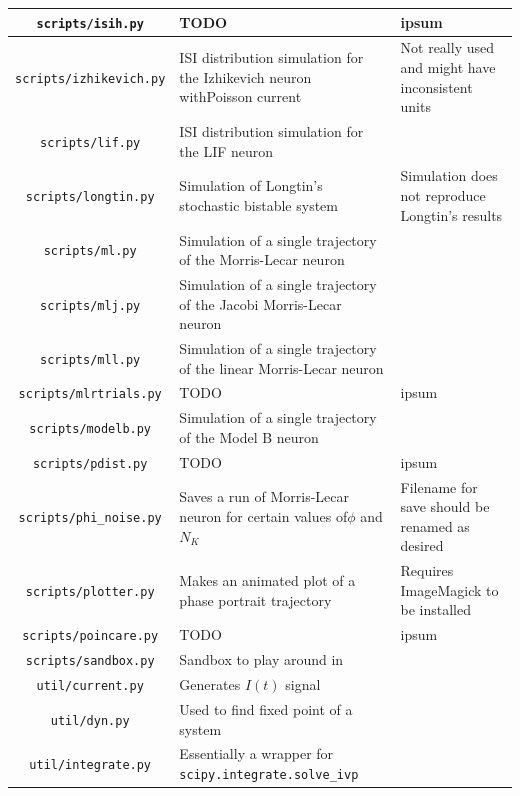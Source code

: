 \documentclass[letterpaper,12pt]{article}
\numberwithin{table}{section}
\numberwithin{figure}{section}
\numberwithin{equation}{section}
\begin{document}
\begin{flushleft}
\begin{center}
\begin{tabularx}{\linewidth}{ | c | Y | X | }
            \hline
            \texttt{scripts/isih.py} & TODO & ipsum \\
            \hline
            \texttt{scripts/izhikevich.py} & ISI distribution simulation for the Izhikevich neuron withPoisson current & Not really used and might have inconsistent units \\
            \hline
            \texttt{scripts/lif.py} & ISI distribution simulation for the LIF neuron & \\
            \hline
            \texttt{scripts/longtin.py} & Simulation of Longtin's stochastic bistable system & Simulation does not reproduce Longtin's results \\
            \hline
            \texttt{scripts/ml.py} & Simulation of a single trajectory of the Morris-Lecar neuron & \\
            \hline
            \texttt{scripts/mlj.py} & Simulation of a single trajectory of the Jacobi Morris-Lecar neuron & \\
            \hline
            \texttt{scripts/mll.py} & Simulation of a single trajectory of the linear Morris-Lecar neuron & \\
            \hline
            \texttt{scripts/mlrtrials.py} & TODO & ipsum \\
            \hline
            \texttt{scripts/modelb.py} & Simulation of a single trajectory of the Model B neuron & \\
            \hline
            \texttt{scripts/pdist.py} & TODO & ipsum \\
            \hline
            \texttt{scripts/phi\_noise.py} & Saves a run of Morris-Lecar neuron for certain values of$\phi$ and $N_K$ & Filename for save should be renamed as desired \\
            \hline
            \texttt{scripts/plotter.py} & Makes an animated plot of a phase portrait trajectory & Requires ImageMagick to be installed \\
            \hline
            \texttt{scripts/poincare.py} & TODO & ipsum \\
            \hline
            \texttt{scripts/sandbox.py} & Sandbox to play around in & \\
            \hline
            \texttt{util/current.py} & Generates $I(t)$ signal & \\
            \hline
            \texttt{util/dyn.py} & Used to find fixed point of a system & \\
            \hline
            \texttt{util/integrate.py} & Essentially a wrapper for \texttt{scipy.integrate.solve\_ivp
}
\end{tabularx}
\end{center}
\end{flushleft}
\end{document}
